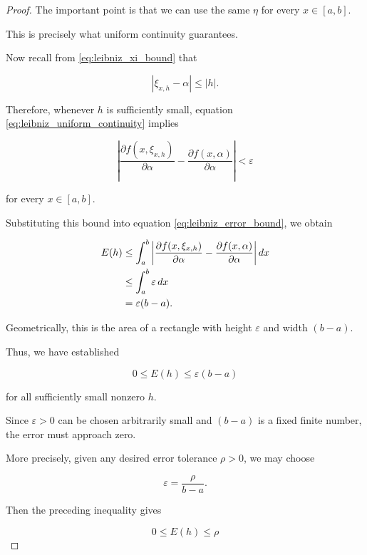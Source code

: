\documentclass[11pt,a4paper]{article}
\theoremstyle{definition}
\theoremstyle{remark}
\begin{document}
\begin{proof}
The important point is that
we can use the same $\eta$
for every $x\in[a,b]$.

This is precisely what
uniform continuity guarantees.

Now recall from
\eqref{eq:leibniz_xi_bound}
that

\[
    |\xi_{x,h}-\alpha|
    \leq |h|.
\]

Therefore, whenever $h$
is sufficiently small,
equation
\eqref{eq:leibniz_uniform_continuity}
implies

\begin{equation}
    \left|
    \frac{\partial f(x,\xi_{x,h})}
         {\partial\alpha}
    -
    \frac{\partial f(x,\alpha)}
         {\partial\alpha}
    \right|
    <\varepsilon
    \label{eq:leibniz_small_integrand}
\end{equation}

for every $x\in[a,b]$.

Substituting this bound
into equation
\eqref{eq:leibniz_error_bound},
we obtain

\begin{align}
    E(h)
    &\leq
    \int_a^b
    \left|
    \frac{\partial f(x,\xi_{x,h})}
         {\partial\alpha}
    -
    \frac{\partial f(x,\alpha)}
         {\partial\alpha}
    \right|dx
    \notag\\
    &\leq
    \int_a^b \varepsilon\,dx
    \notag\\
    &=
    \varepsilon(b-a).
\end{align}



Geometrically, this is
the area of a rectangle
with height $\varepsilon$
and width $(b-a)$.

Thus, we have established

\begin{equation}
    \boxed{
    0\leq E(h)\leq\varepsilon(b-a)
    }
    \label{eq:leibniz_final_error_bound}
\end{equation}

for all sufficiently
small nonzero $h$.

Since $\varepsilon>0$
can be chosen arbitrarily
small and $(b-a)$ is
a fixed finite number,
the error must approach zero.

More precisely, given any
desired error tolerance
$\rho>0$, we may choose

\[
    \varepsilon=\frac{\rho}{b-a}.
\]

Then the preceding
inequality gives

\[
    0\leq E(h)\leq\rho
\]


\end{proof}
\end{document}
